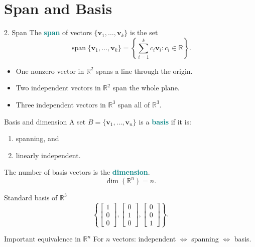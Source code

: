 \documentclass[aspectratio=169,11pt]{beamer}
\newcommand{\R}{\mathbb{R}}
\newcommand{\vect}[1]{\bm{#1}}
\newcommand{\important}[1]{\textcolor{teal}{\textbf{#1}}}
\begin{document}
\section{Span and Basis}
\begin{frame}{2. Span}
The \important{span} of vectors $\{\vect v_1,\ldots,\vect v_k\}$ is the set
\[
\operatorname{span}\{\vect v_1,\ldots,\vect v_k\}
=
\left\{
\sum_{i=1}^{k}c_i\vect v_i:c_i\in\R
\right\}.
\]
\begin{itemize}
\item One nonzero vector in $\R^2$ spans a line through the origin.
\item Two independent vectors in $\R^2$ span the whole plane.
\item Three independent vectors in $\R^3$ span all of $\R^3$.
\end{itemize}

\end{frame}

\begin{frame}{Basis and dimension}
A set $B=\{\vect v_1,\ldots,\vect v_n\}$ is a \important{basis} if it is:
\begin{enumerate}
\item spanning, and
\item linearly independent.
\end{enumerate}
The number of basis vectors is the \important{dimension}.
\[
\dim(\R^n)=n.
\]
\begin{exampleblock}{Standard basis of $\R^3$}
\[
\left\{
\begin{bmatrix}1\\0\\0\end{bmatrix},
\begin{bmatrix}0\\1\\0\end{bmatrix},
\begin{bmatrix}0\\0\\1\end{bmatrix}
\right\}.
\]
\end{exampleblock}
\begin{block}{Important equivalence in $\R^n$}
For $n$ vectors: independent $\Longleftrightarrow$ spanning $\Longleftrightarrow$ basis.
\end{block}
\end{frame}
\end{document}
